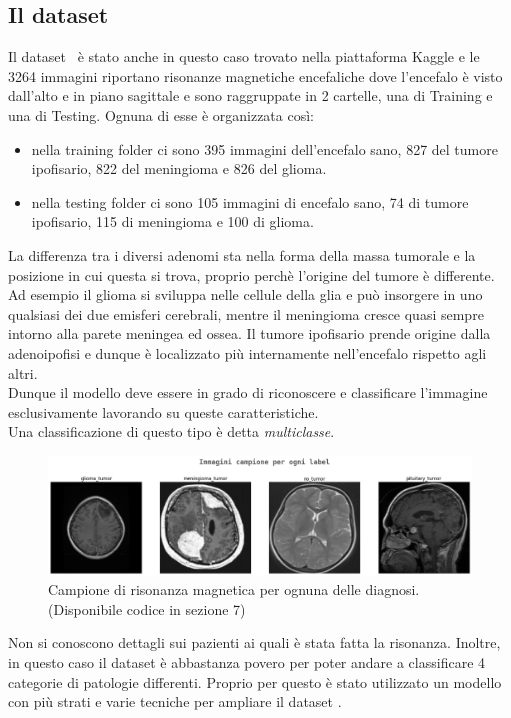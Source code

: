 \subsection{Il dataset}
Il dataset~\cite{dsbrain} è stato anche in questo caso trovato nella piattaforma Kaggle e le 3264
 immagini riportano risonanze magnetiche encefaliche dove l’encefalo è visto dall’alto e
  in piano sagittale e sono raggruppate in 2 cartelle, una di Training e una di Testing.
Ognuna di esse è organizzata così: 
\begin{itemize}
\item nella training folder ci sono 395 immagini dell’encefalo sano, 827 del tumore ipofisario, 822 del meningioma e 826 del glioma. 
\item nella testing folder ci sono 105 immagini di encefalo sano, 74 di tumore ipofisario, 115 di meningioma e 100 di glioma. 
\end{itemize}
La differenza tra i diversi adenomi sta nella forma della massa tumorale e 
la posizione in cui questa si trova, proprio perchè l'origine del tumore è differente.
 Ad esempio il glioma si sviluppa nelle cellule 
della glia e può insorgere in uno qualsiasi dei due emisferi cerebrali, mentre 
il meningioma cresce quasi sempre intorno alla parete meningea ed ossea. Il tumore
 ipofisario prende origine dalla adenoipofisi e dunque è localizzato più internamente
  nell’encefalo rispetto agli altri. \\
Dunque il modello deve essere in grado di riconoscere e classificare l’immagine 
esclusivamente lavorando su queste caratteristiche.\\ 
Una classificazione di questo tipo è detta \emph{multiclasse}. 
\begin{figure}[H]
  \centering
  \includegraphics[width=1.1\textwidth]{Figures/brain-samples.png}
  \caption{\small{Campione di risonanza magnetica per ognuna delle diagnosi. (Disponibile codice in sezione 7)
  } %
  } %
  \label{fi:dcalc}
\end{figure}
Non si conoscono dettagli sui pazienti ai quali è stata fatta la risonanza.
Inoltre, in questo caso il dataset è abbastanza povero per poter andare a classificare 4 
categorie di patologie differenti. Proprio per questo è stato utilizzato un modello con più strati e varie tecniche per ampliare il dataset . \\
